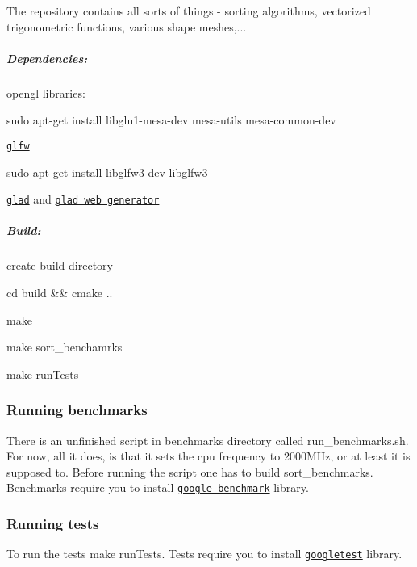 The repository contains all sorts of things -\/ sorting algorithms, vectorized trigonometric functions, various shape meshes,...

\subparagraph*{Dependencies\+:}


\begin{DoxyEnumerate}
\item opengl libraries\+: 
\begin{DoxyCode}
sudo apt-get install libglu1-mesa-dev mesa-utils mesa-common-dev
\end{DoxyCode}

\item \href{https://github.com/glfw/glfw}{\tt glfw} 
\begin{DoxyCode}
sudo apt-get install libglfw3-dev libglfw3
\end{DoxyCode}

\item \href{https://github.com/Dav1dde/glad}{\tt glad} and \href{https://glad.dav1d.de}{\tt glad web generator}
\end{DoxyEnumerate}

\subparagraph*{Build\+:}


\begin{DoxyItemize}
\item create build directory
\item cd build \&\& cmake ..
\item make
\begin{DoxyItemize}
\item make sort\+\_\+benchamrks
\item make run\+Tests
\end{DoxyItemize}
\end{DoxyItemize}

\subsubsection*{Running benchmarks}

There is an unfinished script in benchmarks directory called run\+\_\+benchmarks.\+sh. For now, all it does, is that it sets the cpu frequency to 2000\+M\+Hz, or at least it is supposed to. Before running the script one has to build sort\+\_\+benchmarks. Benchmarks require you to install \href{https://github.com/google/benchmark}{\tt google benchmark} library.

\subsubsection*{Running tests}

To run the tests make run\+Tests. Tests require you to install \href{https://github.com/google/googletest}{\tt googletest} library. 